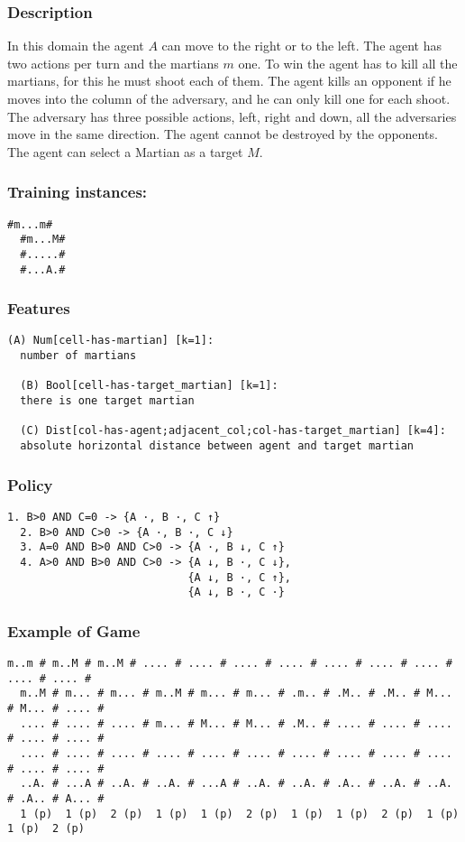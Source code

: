 \documentclass[a4paper]{article}
\begin{document}
\subsubsection{Description}
In this domain the agent $A$ can move to the right or to the left. The agent has two actions per turn and the martians $m$ one. To win the agent has to kill all the martians, for this he must shoot each of them. The agent kills an opponent if he moves into the column of the adversary, and he can only kill one for each shoot. The adversary has three possible actions, left, right and down, all the adversaries move in the same direction. The agent cannot be destroyed by the opponents. The agent can select a Martian as a target $M$.

\subsubsection{Training instances:}
\begin{Verbatim}[fontsize=\footnotesize]
  #m...m#
  #m...M#
  #.....#
  #...A.#
\end{Verbatim}

\subsubsection{Features}
\begin{Verbatim}[fontsize=\footnotesize]
  (A) Num[cell-has-martian] [k=1]:
  number of martians

  (B) Bool[cell-has-target_martian] [k=1]:
  there is one target martian

  (C) Dist[col-has-agent;adjacent_col;col-has-target_martian] [k=4]:
  absolute horizontal distance between agent and target martian
\end{Verbatim}

\subsubsection{Policy}
\begin{Verbatim}[fontsize=\footnotesize]
  1. B>0 AND C=0 -> {A ·, B ·, C ↑}
  2. B>0 AND C>0 -> {A ·, B ·, C ↓}
  3. A=0 AND B>0 AND C>0 -> {A ·, B ↓, C ↑}
  4. A>0 AND B>0 AND C>0 -> {A ↓, B ·, C ↓},
                            {A ↓, B ·, C ↑},
                            {A ↓, B ·, C ·}
\end{Verbatim}

\subsubsection{Example of Game}
\begin{Verbatim}[fontsize=\footnotesize]
  m..m # m..M # m..M # .... # .... # .... # .... # .... # .... # .... # .... # .... #
  m..M # m... # m... # m..M # m... # m... # .m.. # .M.. # .M.. # M... # M... # .... #
  .... # .... # .... # m... # M... # M... # .M.. # .... # .... # .... # .... # .... #
  .... # .... # .... # .... # .... # .... # .... # .... # .... # .... # .... # .... #
  ..A. # ...A # ..A. # ..A. # ...A # ..A. # ..A. # .A.. # ..A. # ..A. # .A.. # A... #
  1 (p)  1 (p)  2 (p)  1 (p)  1 (p)  2 (p)  1 (p)  1 (p)  2 (p)  1 (p)  1 (p)  2 (p)
\end{Verbatim}
\end{document}
